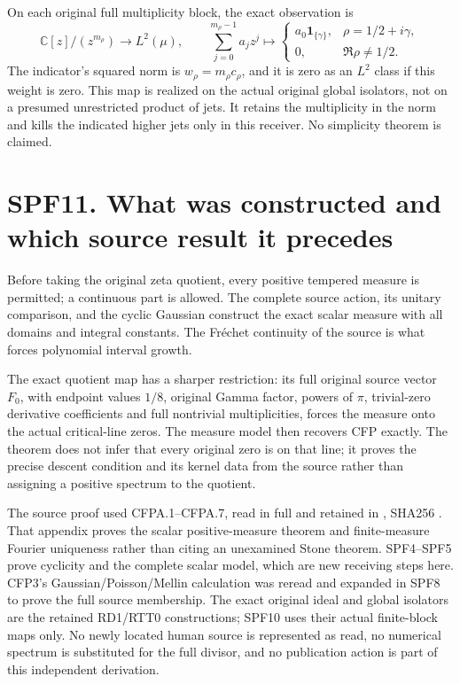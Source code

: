 On each original full multiplicity block, the exact observation is \[
\mathbb C[z]/(z^{m_\rho})\longrightarrow L^2(\mu),\qquad
\sum_{j=0}^{m_\rho-1}a_jz^j\longmapsto
\begin{cases}a_0\mathbf 1_{\{\gamma\}},&\rho=1/2+i\gamma,
\\0,&\Re\rho\ne1/2.
\end{cases}
\tag{SPF10.4}
\] The indicator's squared norm is \(w_\rho=m_\rho c_\rho\), and it is
zero as an \(L^2\) class if this weight is zero. This map is realized on
the actual original global isolators, not on a presumed unrestricted
product of jets. It retains the multiplicity in the norm and kills the
indicated higher jets only in this receiver. No simplicity theorem is
claimed.

\section{SPF11. What was constructed and which source result it
precedes}\label{spf11.-what-was-constructed-and-which-source-result-it-precedes}

Before taking the original zeta quotient, every positive tempered
measure is permitted; a continuous part is allowed. The complete source
action, its unitary comparison, and the cyclic Gaussian construct the
exact scalar measure with all domains and integral constants. The
Fréchet continuity of the source is what forces polynomial interval
growth.

The exact quotient map has a sharper restriction: its full original
source vector \(F_0\), with endpoint values \(1/8\), original Gamma
factor, powers of \(\pi\), trivial-zero derivative coefficients and full
nontrivial multiplicities, forces the measure onto the actual
critical-line zeros. The measure model then recovers CFP exactly. The
theorem does not infer that every original zero is on that line; it
proves the precise descent condition and its kernel data from the source
rather than assigning a positive spectrum to the quotient.

The source proof used CFPA.1--CFPA.7, read in full and retained in
\href{https://github.com/KokunoYumeto/zeta-function-research-reader/blob/main/workbenches/splitzero-tandem/continuations/20260925-full-source-tensor-and-original-divisor/gct/CONTINUOUS_POSITIVE_TRANSFER_FORMS.md}{},
SHA256
.
That appendix proves the scalar positive-measure theorem and
finite-measure Fourier uniqueness rather than citing an unexamined Stone
theorem. SPF4--SPF5 prove cyclicity and the complete scalar model, which
are new receiving steps here. CFP3's Gaussian/Poisson/Mellin calculation
was reread and expanded in SPF8 to prove the full source membership. The
exact original ideal and global isolators are the retained RD1/RTT0
constructions; SPF10 uses their actual finite-block maps only. No newly
located human source is represented as read, no numerical spectrum is
substituted for the full divisor, and no publication action is part of
this independent derivation.

